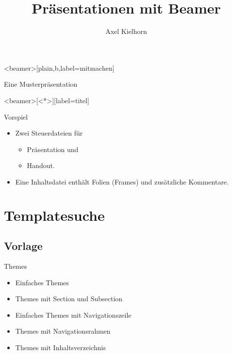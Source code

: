 \documentclass{beamer}
\title{Präsentationen mit Beamer}
\author{Axel Kielhorn}
\begin{document}
\begin{frame}<beamer>[plain,b,label=mitmachen] %

\huge\bfseries\color{structure!20} %

Eine Musterpräsentation

\vspace*{7.1cm}

\end{frame}



\begin{frame}<beamer>[<*>][label=titel]{}
  \titlepage
\end{frame}

\maketitle

\begin{frame}[label=vorspiel]{Vorspiel}
  \begin{itemize}[<*>]
    \item Zwei Steuerdateien für 
      \begin{itemize}
        \item Präsentation und
        \item Handout.
      \end{itemize}     
    \item Eine Inhaltsdatei enthält Folien (Frames) und zusätzliche Kommentare.
  \end{itemize}
\end{frame}

\section{Templatesuche}
\subsection{Vorlage}
\begin{frame}[label=theme]{Themes}
   \begin{itemize}[<*>]
  \item
    Einfaches Themes
  \item
    Themes mit Section und Subsection
  \item
    Einfaches Themes mit Navigationszeile
  \item
    Themes mit Navigationsrahmen
  \item
    Themes mit Inhaltsverzeichnis
  \end{itemize}
\end{frame}
\end{document}
